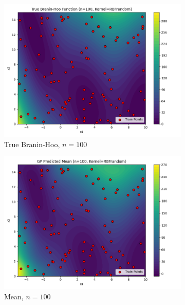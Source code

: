 \documentclass[a4paper,12pt]{article}
\begin{document}
\begin{figure}[H]
\begin{subfigure}{0.3\textwidth}
  \includegraphics[width=\linewidth]{Task-02/images/true_function_rbf_n100_random.png}
  \caption{True Branin-Hoo, $n=100$}
\end{subfigure}
\begin{subfigure}{0.3\textwidth}
    \includegraphics[width=\linewidth]{Task-02/images/gp_mean_rbf_n100_random.png}
    \caption{Mean, $n=100$}
\end{subfigure}
\begin{subfigure}{0.3\textwidth}

\end{subfigure}
\end{figure}
\end{document}
